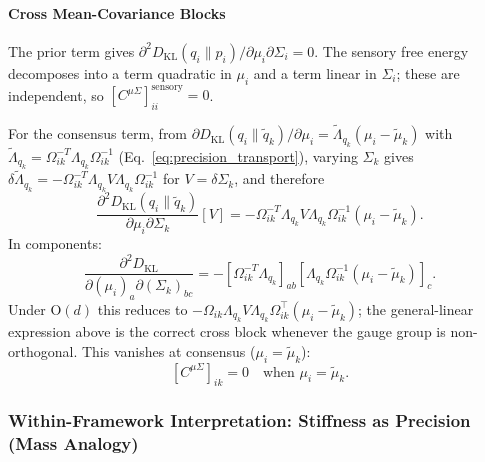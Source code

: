 \documentclass[11pt]{article}
\begin{document}
\paragraph{Cross Mean-Covariance Blocks}

The prior term gives $\partial^2 D_{\mathrm{KL}}(q_i \| p_i)/\partial \mu_i \partial \Sigma_i = 0$. The sensory free energy decomposes into a term quadratic in $\mu_i$ and a term linear in $\Sigma_i$; these are independent, so $[C^{\mu\Sigma}]_{ii}^{\mathrm{sensory}} = 0$.

For the consensus term, from $\partial D_{\mathrm{KL}}(q_i \| \tilde{q}_k)/\partial \mu_i = \tilde{\Lambda}_{q_k}(\mu_i - \tilde{\mu}_k)$ with $\tilde{\Lambda}_{q_k} = \Omega_{ik}^{-T}\Lambda_{q_k}\Omega_{ik}^{-1}$ (Eq.~\eqref{eq:precision_transport}), varying $\Sigma_k$ gives $\delta\tilde{\Lambda}_{q_k} = -\Omega_{ik}^{-T}\Lambda_{q_k} V \Lambda_{q_k}\Omega_{ik}^{-1}$ for $V = \delta\Sigma_k$, and therefore
\begin{equation}
\frac{\partial^2 D_{\mathrm{KL}}(q_i \| \tilde{q}_k)}{\partial \mu_i \partial \Sigma_k}[V] = -\Omega_{ik}^{-T}\Lambda_{q_k} V \Lambda_{q_k} \Omega_{ik}^{-1} (\mu_i - \tilde{\mu}_k).
\end{equation}
In components:
\begin{equation}
\frac{\partial^2 D_{\mathrm{KL}}}{\partial(\mu_i)_a \partial(\Sigma_k)_{bc}} = -[\Omega_{ik}^{-T}\Lambda_{q_k}]_{ab}[\Lambda_{q_k}\Omega_{ik}^{-1}(\mu_i - \tilde{\mu}_k)]_c.
\end{equation}
Under $\mathrm{O}(d)$ this reduces to $-\Omega_{ik}\Lambda_{q_k} V \Lambda_{q_k}\Omega_{ik}^\top(\mu_i - \tilde{\mu}_k)$; the general-linear expression above is the correct cross block whenever the gauge group is non-orthogonal.
This vanishes at consensus ($\mu_i = \tilde{\mu}_k$):
\begin{equation}
\boxed{[C^{\mu\Sigma}]_{ik} = 0 \quad \text{when } \mu_i = \tilde{\mu}_k.}
\label{eq:cross_block}
\end{equation}

\subsubsection{Within-Framework Interpretation: Stiffness as Precision (Mass Analogy)}
\end{document}
